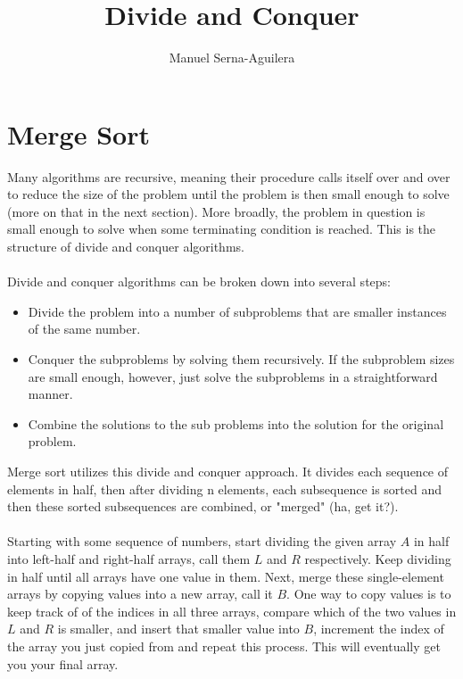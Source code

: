 \documentclass{article}
\title{Divide and Conquer}
\author{Manuel Serna-Aguilera}
\date{}
\begin{document}
\maketitle
\section*{Merge Sort}
Many algorithms are recursive, meaning their procedure calls itself over and over to reduce the size of the problem until the problem is then small enough to solve (more on that in the next section). More broadly, the problem in question is small enough to solve when some terminating condition is reached. This is the structure of divide and conquer algorithms.
\\
\\
Divide and conquer algorithms can be broken down into several steps:
\begin{itemize}
  \item Divide the problem into a number of subproblems that are smaller instances of the same number.
  \item Conquer the subproblems by solving them recursively. If the subproblem sizes are small enough, however, just solve the subproblems in a straightforward manner.
  \item Combine the solutions to the sub problems into the solution for the original problem.
\end{itemize}
Merge sort utilizes this divide and conquer approach. It divides each sequence of elements in half, then after dividing n elements, each subsequence is sorted and then these sorted subsequences are combined, or "merged" (ha, get it?).
\\
\\
Starting with some sequence of numbers, start dividing the given array $A$ in half into left-half and right-half arrays, call them $L$ and $R$ respectively. Keep dividing in half until all arrays have one value in them. Next, merge these single-element arrays by copying values into a new array, call it $B$. One way to copy values is to keep track of of the indices in all three arrays, compare which of the two values in $L$ and $R$ is smaller, and insert that smaller value into $B$, increment the index of the array you just copied from and repeat this process. This will eventually get you your final array.
\newpage
\end{document}
